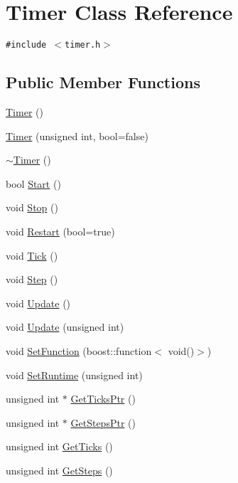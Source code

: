 \hypertarget{class_timer}{
\section{Timer Class Reference}
\label{class_timer}
}
{\tt \#include $<$timer.h$>$}

\subsection*{Public Member Functions}
\begin{CompactItemize}
\item 
\hyperlink{class_timer_5f16e8da27d2a5a5242dead46de05d97}{Timer} ()
\item 
\hyperlink{class_timer_eac46d188030ef2d2c8dabca19dd5b79}{Timer} (unsigned int, bool=false)
\item 
\hyperlink{class_timer_14fa469c4c295c5fa6e66a4ad1092146}{$\sim$Timer} ()
\item 
bool \hyperlink{class_timer_394a9f2ca8ebd30053b6078c183c66be}{Start} ()
\item 
void \hyperlink{class_timer_6379e797f968aaee6ac3bb12dc6b81c5}{Stop} ()
\item 
void \hyperlink{class_timer_0231c7290412a2e3a582b71e7c17bd97}{Restart} (bool=true)
\item 
void \hyperlink{class_timer_f90455f3201a327ae96eb37e21a9ca31}{Tick} ()
\item 
void \hyperlink{class_timer_a48af006144f41f1c7641cf05fca70d1}{Step} ()
\item 
void \hyperlink{class_timer_77a6595649759e7236d1b43c2c10e16b}{Update} ()
\item 
void \hyperlink{class_timer_3d479c440805436b4b61704e33b0484b}{Update} (unsigned int)
\item 
void \hyperlink{class_timer_595dad5b13910a416694a1cdb7806b78}{SetFunction} (boost::function$<$ void()$>$)
\item 
void \hyperlink{class_timer_ce5ec35279c13d6adbf3923e7cc53010}{SetRuntime} (unsigned int)
\item 
unsigned int $\ast$ \hyperlink{class_timer_8ebf68da672a80a4fe91cbf32dbaea94}{GetTicksPtr} ()
\item 
unsigned int $\ast$ \hyperlink{class_timer_0c9c95ff67e7c2412f405e9ad1c774ee}{GetStepsPtr} ()
\item 
unsigned int \hyperlink{class_timer_ae8ab344903fe4e08c16ea5f3bc2c5db}{GetTicks} ()
\item 
unsigned int \hyperlink{class_timer_7138e307d4affcfaa1755ad3205c3a11}{GetSteps} ()
\end{CompactItemize}


